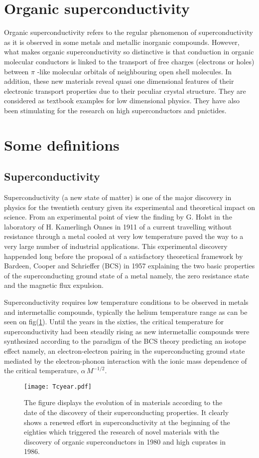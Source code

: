 \documentclass[11pt]{article} %
\begin{document}
\section{Organic superconductivity}
Organic superconductivity refers to the regular phenomenon  of superconductivity as it is observed in some metals and metallic inorganic compounds. However, what makes organic superconductivity so distinctive is that  conduction in organic molecular conductors  is linked to the transport of free charges (electrons or holes) between $\pi$ -like molecular orbitals of neighbouring open shell molecules. In addition, these new materials reveal quasi one dimensional features of their  electronic transport properties due to their peculiar crystal structure. They are considered as textbook examples for  low dimensional physics. They have also been stimulating for the research on high \tc superconductors and pnictides. 
\section{Some definitions}
\subsection{Superconductivity}
Superconductivity (a new state of matter) is one of the major discovery in physics for the twentieth century given its experimental and theoretical impact on science. From an experimental point of view the finding by G. Holst in the laboratory of H. Kamerlingh Onnes\cite{Onnes11} in 1911 of a current travelling   without resistance through a metal cooled at very low temperature paved the way to a very large number of industrial applications. This experimental discovery happended long before the proposal of a satisfactory theoretical framework by Bardeen, Cooper and Schrieffer (BCS)\cite{Bardeen57} in 1957 explaining the two basic   properties of the superconducting ground state of a metal namely, the zero resistance state and the magnetic flux expulsion.  

Superconductivity requires low temperature conditions to be observed in metals and intermetallic compounds, typically the helium temperature range as can be seen on fig(\ref{Tcyear.pdf}). Until the years in the sixties, the critical temperature for superconductivity had been steadily rising as new intermetallic  compounds were synthesized according to the paradigm of the BCS theory predicting an isotope effect   namely, an electron-electron pairing in the superconducting ground state  mediated by the electron-phonon interaction with  the ionic mass dependence of the critical temperature, \tc $\alpha \,M^{-1/2}$\cite{Bardeen57}.
\begin{figure}[h]	
\centerline{\texttt{[image: Tcyear.pdf]}}		
\caption{The figure displays the evolution of \tc in materials according to the date of the discovery of their superconducting properties. It clearly shows a renewed effort in superconductivity at the beginning of the  eighties which triggered the research of novel materials with the discovery of  organic superconductors in 1980 and  high \tc cuprates in 1986.}
\label{Tcyear.pdf}
\end{figure}
 
\end{document}
